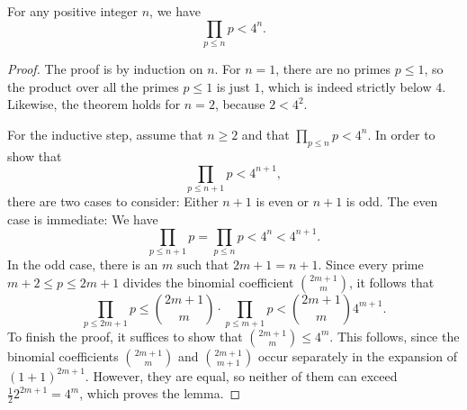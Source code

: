 


\begin{lemma}\label{lemma:upper-bound-product-of-primes}
  For any positive integer $n$, we have
  \begin{equation*}
    \prod_{p\leq n}p< 4^n.
  \end{equation*}
\end{lemma}

\begin{proof}
  The proof is by induction on $n$. For $n=1$, there are no primes $p\leq 1$, so the product over all the primes $p\leq 1$ is just $1$, which is indeed strictly below $4$. Likewise, the theorem holds for $n=2$, because $2<4^2$.

  For the inductive step, assume that $n\geq 2$ and that $\prod_{p\leq n}p<4^n$. In order to show that
  \begin{equation*}
    \prod_{p\leq n+1}p < 4^{n+1},
  \end{equation*}
  there are two cases to consider: Either $n+1$ is even or $n+1$ is odd. The even case is immediate: We have
  \begin{equation*}
    \prod_{p\leq n+1}p = \prod_{p\leq n}p < 4^n < 4^{n+1}.
  \end{equation*}
  In the odd case, there is an $m$ such that $2m+1=n+1$. Since every prime $m+2\leq p \leq 2m+1$ divides the binomial coefficient $\binom{2m+1}{m}$, it follows that
  \begin{equation*}
    \prod_{p\leq 2m+1}p\leq \binom{2m+1}{m}\cdot \prod_{p\leq m+1}p < \binom{2m + 1}{m} 4^{m+1}.
  \end{equation*}
  To finish the proof, it suffices to show that $\binom{2m+1}{m}\leq 4^m$. This follows, since the binomial coefficients $\binom{2m+1}{m}$ and $\binom{2m+1}{m+1}$ occur separately in the expansion of $(1+1)^{2m+1}$. However, they are equal, so neither of them can exceed $\frac{1}{2} 2^{2m+1}=4^m$, which proves the lemma.
\end{proof}

